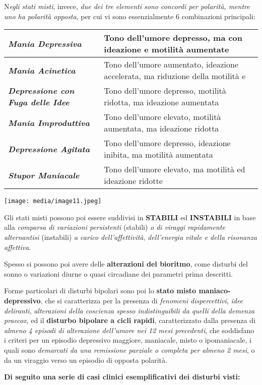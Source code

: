 \documentclass[]{article}
\begin{document}
N\emph{egli stati misti}, invece, \emph{due dei tre elementi sono
concordi per polarità, mentre uno ha polarità opposta}, per cui vi sono
essenzialmente 6 combinazioni principali:

\begin{longtable}[]{@{}ll@{}}
\toprule
\textbf{\emph{Mania Depressiva}} & Tono dell'umore depresso, ma con
ideazione e motilità aumentate\tabularnewline
\midrule
\endhead
\textbf{\emph{Mania Acinetica}} & Tono dell'umore aumentato, ideazione
accelerata, ma riduzione della motilità e\tabularnewline
\textbf{\emph{Depressione con Fuga delle Idee}} & Tono dell'umore
depresso, motilità ridotta, ma ideazione aumentata\tabularnewline
\textbf{\emph{Mania Improduttiva}} & Tono dell'umore elevato, motilità
aumentata, ma ideazione ridotta\tabularnewline
\textbf{\emph{Depressione Agitata}} & Tono dell'umore depresso,
ideazione inibita, ma motilità aumentata\tabularnewline
\textbf{\emph{Stupor Maniacale}} & Tono dell'umore elevato, ma motilità
ed ideazione ridotte\tabularnewline
\bottomrule
\end{longtable}

\texttt{[image: media/image11.jpeg]}

Gli stati misti possono poi essere suddivisi in \textbf{STABILI} ed
\textbf{INSTABILI} in base alla \emph{comparsa di variazioni
persistenti} (stabili) \emph{o di viraggi rapidamente alternantisi}
(instabili) \emph{a carico dell'affettività}, \emph{dell'energia vitale
e della risonanza affettiva}.

Spesso si possono poi avere delle \textbf{alterazioni del bioritmo},
come disturbi del sonno o variazioni diurne o quasi circadiane dei
parametri prima descritti.

Forme particolari di disturbi bipolari sono poi lo \textbf{stato misto
maniaco-depressivo}, che si caratterizza per la presenza di
\emph{fenomeni dispercettivi}, \emph{idee deliranti}, \emph{alterazioni
della coscienza spesso indistinguibili da quelli della demenza praecox},
ed il \textbf{disturbo bipolare a cicli rapidi}, caratterizzato dalla
presenza di \emph{almeno 4 episodi di alterazione dell'umore nei 12 mesi
precedenti}, che soddisfano i criteri per un episodio depressivo
maggiore, maniacale, misto o ipomaniacale, i quali sono \emph{demarcati
da una remissione parziale o completa per almeno 2 mesi}, o da un
viraggio verso un episodio di opposta polarità.

\textbf{Di seguito una serie di casi clinici esemplificativi dei
disturbi visti:}
\end{document}
